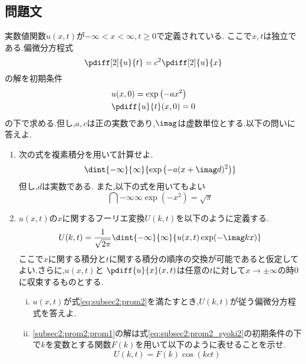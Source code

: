 \documentclass[dvipdfmx,titlepage, 11pt, a4paper]{jsarticle}%
\begin{document}
\subsection{問題文}
実数値関数$u(x, t)$が$-\infty < x < \infty, t \geq 0$で定義されている.
ここで$x, t$は独立である.偏微分方程式
\begin{equation}
    \pdiff[2]{u}{t} = c^{2}\pdiff[2]{u}{x}\label{eq:subsec2:prom2}
\end{equation}
の解を初期条件
\begin{align}
    & u(x, 0) = \exp\left(-ax^{2}\right)\label{eq:subsec2:prom2_syoki1}\\
    & \pdiff{u}{t}(x, 0) = 0\label{eq:subsec2:prom2_syoki2}
\end{align}
の下で求める.但し,$a, c$は正の実数であり,$\imag$は虚数単位とする.以下の問いに答えよ.
\begin{enumerate}[(1)]
    \setlength{\itemsep}{10pt}
    \item 次の式を複素積分を用いて計算せよ.\label{subsec2:prom1}
    \begin{equation*}
        \dint{-\infty}{\infty}{\exp\left(-a(x + \imag d)^{2}\right)}
    \end{equation*}
    但し,$d$は実数である.
    また,以下の式を用いてもよい
    \begin{equation*}
        \dint{-\infty}{\infty}{\exp\left(-x^2\right)} = \sqrt{\pi}
    \end{equation*}
    \item $u(x, t)$の$x$に関するフーリエ変換$U(k, t)$を以下のように定義する.\label{subsec2:prom2}
    \begin{equation*}
        U(k, t) = \frac{1}{\sqrt{2\pi}}\dint{-\infty}{\infty}{u(x, t)\exp(-\imag kx)}
    \end{equation*}
    ここで$x$に関する積分と$t$に関する積分の順序の交換が可能であると仮定してよい.さらに,$u(x, t)$と
    $\pdiff{u}{x}(x, t)$は任意の$t$に対して$x \rightarrow\pm\infty$の時0に収束するものとする.
    \begin{enumerate}[(i)]
        \setlength{\itemsep}{10pt}
        \item $u(x, t)$が式\eqref{eq:subsec2:prom2}を満たすとき,$U(k, t)$が従う偏微分方程式を答えよ.\label{subsec2:prom2:prom1}
        \item \eqref{subsec2:prom2:prom1}の解は式\eqref{eq:subsec2:prom2_syoki2}の初期条件の下で$k$を変数とする関数$F(k)$を用いて以下のように表せることを示せ.\label{subsec2:prom2:prom2}
        \begin{equation*}
            U(k, t) = F(k)\cos(kct)

\end{equation*}
\end{enumerate}
\end{enumerate}
\end{document}

